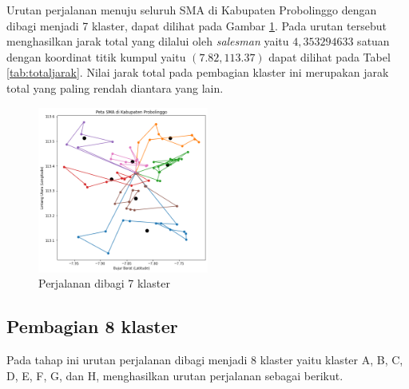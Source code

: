 Urutan perjalanan menuju seluruh SMA di Kabupaten Probolinggo dengan dibagi menjadi 7 klaster, dapat dilihat pada Gambar \ref{fig:hasil_mtsp7}. Pada urutan tersebut menghasilkan jarak total yang dilalui oleh \textit{salesman} yaitu $4,353294633$ satuan dengan koordinat titik kumpul yaitu $(7.82, 113.37)$ dapat dilihat pada Tabel \ref{tab:totaljarak}. Nilai jarak total pada pembagian klaster ini merupakan jarak total yang paling rendah diantara yang lain.

\begin{figure}[H]
\centering
\includegraphics[width=0.5\textwidth]{Gambar/hasil_mtsp/7}
\caption{Perjalanan dibagi 7 klaster}
\label{fig:hasil_mtsp7}
\end{figure}

\subsection{Pembagian 8 klaster}

Pada tahap ini urutan perjalanan dibagi menjadi 8 klaster yaitu klaster A, B, C, D, E, F, G, dan H, menghasilkan urutan perjalanan sebagai berikut.

